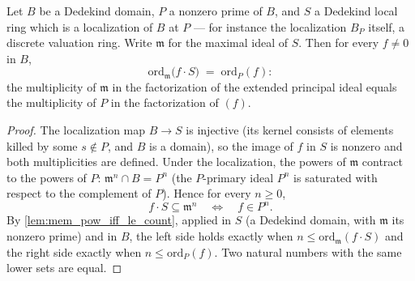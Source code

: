 \begin{theorem}
  \label{thm:count_factors_span_localization}
  \leanok
  Let \(B\) be a Dedekind domain, \(P\) a nonzero prime of \(B\), and \(S\) a Dedekind
  local ring which is a localization of \(B\) at \(P\) --- for instance the
  localization \(B_P\) itself, a discrete valuation ring. Write \(\mathfrak m\) for the
  maximal ideal of \(S\). Then for every \(f \neq 0\) in \(B\),
  \[
    \mathrm{ord}_{\mathfrak m}\bigl(f \cdot S\bigr) \;=\; \mathrm{ord}_P(f) :
  \]
  the multiplicity of \(\mathfrak m\) in the factorization of the extended principal
  ideal equals the multiplicity of \(P\) in the factorization of \((f)\).
\end{theorem}
\begin{proof}
  \leanok
  The localization map \(B \to S\) is injective (its kernel consists of elements killed
  by some \(s \notin P\), and \(B\) is a domain), so the image of \(f\) in \(S\) is
  nonzero and both multiplicities are defined. Under the localization, the powers of
  \(\mathfrak m\) contract to the powers of \(P\): \(\mathfrak m^n \cap B = P^n\)
  (the \(P\)-primary ideal \(P^n\) is saturated with respect to the complement of
  \(P\)). Hence for every \(n \ge 0\),
  \[
    f \cdot S \subseteq \mathfrak m^n
    \quad\Longleftrightarrow\quad
    f \in P^n .
  \]
  By \ref{lem:mem_pow_iff_le_count}, applied in \(S\) (a Dedekind domain, with
  \(\mathfrak m\) its nonzero prime) and in \(B\), the left side holds exactly when
  \(n \le \mathrm{ord}_{\mathfrak m}(f \cdot S)\) and the right side exactly when
  \(n \le \mathrm{ord}_P(f)\). Two natural numbers with the same lower sets are equal.
\end{proof}

